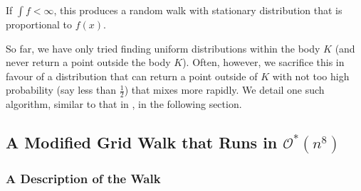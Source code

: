 If $\int f < \infty$, this produces a random walk with stationary distribution that is proportional to $f(x)$.

So far, we have only tried finding uniform distributions within the body $K$ (and never return a point outside the body $K$). Often, however, we sacrifice this in favour of a distribution that can return a point outside of $K$ with not too high probability (say less than $\frac{1}{2}$) that mixes more rapidly. We detail one such algorithm, similar to that in \cite{dyer-frieze-sample-outside}, in the following section.

\subsection{A Modified Grid Walk that Runs in \texorpdfstring{$\mathcal{O}^*(n^8)$}{}}

\subsubsection{A Description of the Walk}

